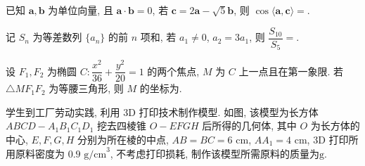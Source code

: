 \begin{question}
已知 $\boldsymbol{a}, \boldsymbol{b}$ 为单位向量, 且 $\boldsymbol{a} \cdot \boldsymbol{b} = 0$, 若 $\boldsymbol{c} = 2\boldsymbol{a} - \sqrt{5}\boldsymbol{b}$, 则 $\cos\langle\boldsymbol{a}, \boldsymbol{c}\rangle =$\gkblank{}.

\end{question}
\begin{question}
记 $S_n$ 为等差数列 $\{a_n\}$ 的前 $n$ 项和, 若 $a_1 \neq 0$, $a_2 = 3a_1$, 则 $\dfrac{S_{10}}{S_5} =$\gkblank{}.

\end{question}
\begin{question}
设 $F_1, F_2$ 为椭圆 $C: \dfrac{x^2}{36} + \dfrac{y^2}{20} = 1$ 的两个焦点, $M$ 为 $C$ 上一点且在第一象限. 若 $\triangle MF_1F_2$ 为等腰三角形, 则 $M$ 的坐标为\gkblank{}.

\Needspace{0.4\textheight}
\end{question}
\begin{question}
学生到工厂劳动实践, 利用 3D 打印技术制作模型. 如图, 该模型为长方体 $ABCD - A_1B_1C_1D_1$ 挖去四棱锥 $O - EFGH$ 后所得的几何体, 其中 $O$ 为长方体的中心, $E, F, G, H$ 分别为所在棱的中点, $AB = BC = 6\text{ cm}$, $AA_1 = 4\text{ cm}$, 3D 打印所用原料密度为 $0.9\text{ g/cm}^3$, 不考虑打印损耗, 制作该模型所需原料的质量为\gkblank{}$\text{g}$.
\nopagebreak[4]
\begin{center}\end{center}
\nopagebreak[4]
\par\medskip

\end{question}


